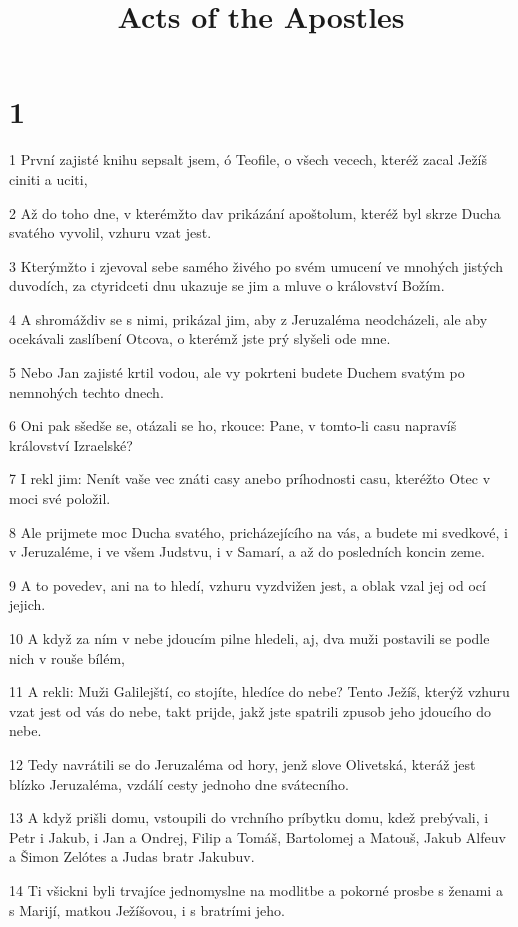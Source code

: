 

\title{Acts of the Apostles}

\chapter{1}

\par 1 První zajisté knihu sepsalt jsem, ó Teofile, o všech vecech, kteréž zacal Ježíš ciniti a uciti,
\par 2 Až do toho dne, v kterémžto dav prikázání apoštolum, kteréž byl skrze Ducha svatého vyvolil, vzhuru vzat jest.
\par 3 Kterýmžto i zjevoval sebe samého živého po svém umucení ve mnohých jistých duvodích, za ctyridceti dnu ukazuje se jim a mluve o království Božím.
\par 4 A shromáždiv se s nimi, prikázal jim, aby z Jeruzaléma neodcházeli, ale aby ocekávali zaslíbení Otcova, o kterémž jste prý slyšeli ode mne.
\par 5 Nebo Jan zajisté krtil vodou, ale vy pokrteni budete Duchem svatým po nemnohých techto dnech.
\par 6 Oni pak sšedše se, otázali se ho, rkouce: Pane, v tomto-li casu napravíš království Izraelské?
\par 7 I rekl jim: Nenít vaše vec znáti casy anebo príhodnosti casu, kteréžto Otec v moci své položil.
\par 8 Ale prijmete moc Ducha svatého, pricházejícího na vás, a budete mi svedkové, i v Jeruzaléme, i ve všem Judstvu, i v Samarí, a až do posledních koncin zeme.
\par 9 A to povedev, ani na to hledí, vzhuru vyzdvižen jest, a oblak vzal jej od ocí jejich.
\par 10 A když za ním v nebe jdoucím pilne hledeli, aj, dva muži postavili se podle nich v rouše bílém,
\par 11 A rekli: Muži Galilejští, co stojíte, hledíce do nebe? Tento Ježíš, kterýž vzhuru vzat jest od vás do nebe, takt prijde, jakž jste spatrili zpusob jeho jdoucího do nebe.
\par 12 Tedy navrátili se do Jeruzaléma od hory, jenž slove Olivetská, kteráž jest blízko Jeruzaléma, vzdálí cesty jednoho dne svátecního.
\par 13 A když prišli domu, vstoupili do vrchního príbytku domu, kdež prebývali, i Petr i Jakub, i Jan a Ondrej, Filip a Tomáš, Bartolomej a Matouš, Jakub Alfeuv a Šimon Zelótes a Judas bratr Jakubuv.
\par 14 Ti všickni byli trvajíce jednomyslne na modlitbe a pokorné prosbe s ženami a s Marijí, matkou Ježíšovou, i s bratrími jeho.
